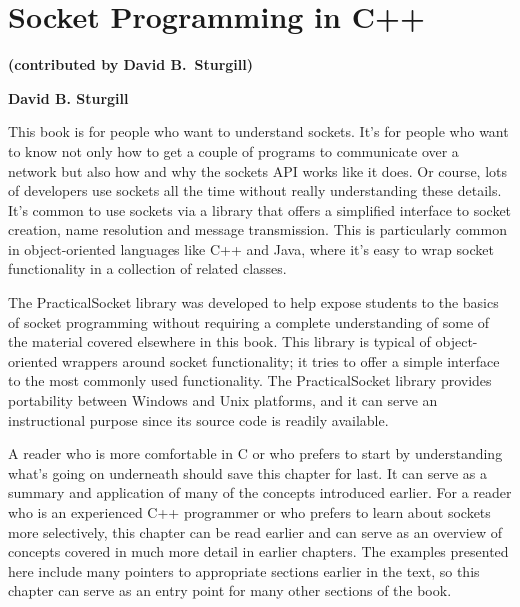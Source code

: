 	
\chapter{Socket Programming in C++}
\label{chap:cpp}

\vspace{-0.3in}
\textbf{(contributed by David B.\ Sturgill)}

\vspace{-0.2in}
{\Large {\bf David B. Sturgill}}
\vspace{0.3in}

This book is for people who want to understand sockets.  It's for
people who want to know not only how to get a couple of programs to
communicate over a network but also how and why the sockets API works
like it does.  Or course, lots of developers use sockets all the time
without really understanding these details.  It's common to use
sockets via a library that offers a simplified interface to socket
creation, name resolution and message transmission.  This is
particularly common in object-oriented languages like C++ and Java,
where it's easy to wrap socket functionality in a collection of
related classes.

The PracticalSocket library was developed to help expose students to
the basics of socket programming without requiring a complete
understanding of some of the material covered elsewhere in this book.
This library is typical of object-oriented wrappers around socket
functionality; it tries to offer a simple interface to the most
commonly used functionality.  The PracticalSocket library provides
portability between Windows and Unix platforms, and it can serve an
instructional purpose since its source code is readily available.

A reader who is more comfortable in C or who prefers to start by
understanding what's going on underneath should save this chapter for
last.  It can serve as a summary and application of many of the
concepts introduced earlier.  For a reader who is an experienced C++
programmer or who prefers to learn about sockets more selectively,
this chapter can be read earlier and can serve as an overview of
concepts covered in much more detail in earlier chapters.  The
examples presented here include many pointers to appropriate sections
earlier in the text, so this chapter can serve as an entry point for
many other sections of the book.

